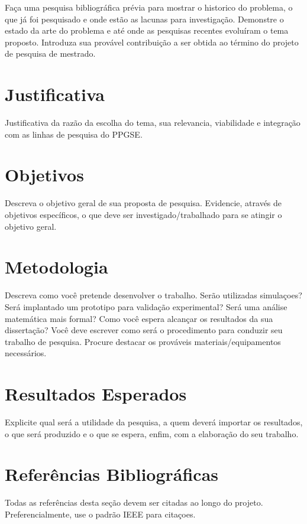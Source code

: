 \documentclass[a4paper,12pt]{article}
\begin{document}
Faça uma pesquisa bibliográfica prévia para mostrar o historico do problema, o que já foi pesquisado e onde estão as lacunas para investigação. Demonstre o estado da arte do problema e até onde as pesquisas recentes evoluíram o tema proposto. Introduza sua provável contribuição a ser obtida ao término do projeto de pesquisa de mestrado.


\section{Justificativa}
Justificativa da razão da escolha do tema, sua relevancia, viabilidade e integração com as linhas de pesquisa do PPGSE.



\section{Objetivos}
Descreva o objetivo geral de sua proposta de pesquisa. Evidencie, através de objetivos específicos, o que deve ser investigado/trabalhado para se atingir o objetivo geral.


\section{Metodologia}
Descreva como você pretende desenvolver o trabalho. Serão utilizadas simulaçoes? Será implantado um prototipo para validação experimental? Será uma análise matemática mais formal? Como você espera alcançar os resultados da sua dissertação? Você deve escrever como será o procedimento para conduzir seu trabalho de pesquisa. Procure destacar os prováveis materiais/equipamentos necessários.


\section{Resultados Esperados}
Explicite qual será a utilidade da pesquisa, a quem deverá importar os resultados, o que será produzido e o que se espera, enfim, com a elaboração do seu trabalho. 


\section*{Referências Bibliográficas}
Todas as referências desta seção devem ser citadas ao longo do projeto. Preferencialmente, use o padrão IEEE para citaçoes.


%
%
\end{document}

